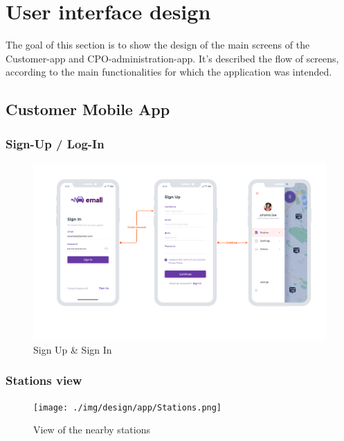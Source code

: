 \section{User interface design}
The goal of this section is to show the design of the main screens of the Customer-app and CPO-administration-app. 
It's described the flow of screens, according to the main functionalities for which the application was intended.

\subsection{Customer Mobile App}

\subsubsection{Sign-Up / Log-In}
\begin{center}
    \begin{figure}[H]
        \includegraphics[width=\textwidth]{./img/design/app/Signup_login.png}
        \caption{Sign Up \& Sign In}
    \end{figure}
\end{center}

\subsubsection{Stations view}
\begin{center}
    \begin{figure}[H]
        \texttt{[image: ./img/design/app/Stations.png]}
        \caption{View of the nearby stations}
    \end{figure}
\end{center}


